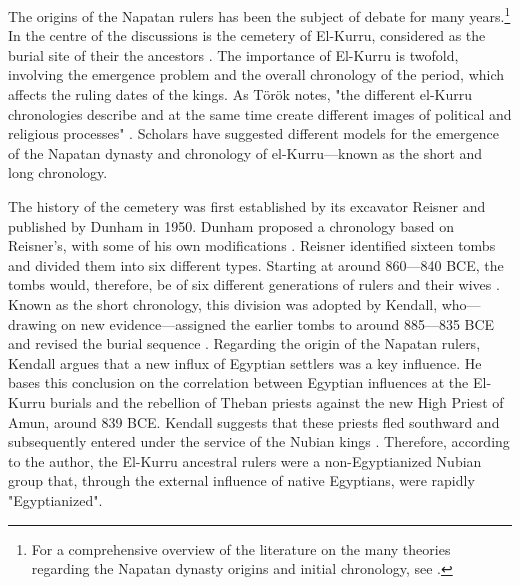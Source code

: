 The origins of the Napatan rulers has been the subject of debate for many years.\footnote{For a comprehensive overview of the literature on the many theories regarding the Napatan dynasty origins and initial chronology, see \cite{morkotPriestlyOriginNapatan2003}.} In the centre of the discussions is the cemetery of El-Kurru, considered as the burial site of their the ancestors \parencite{törökKingdomKushHandbook1997, törökTwoWorldsFrontier2009, morkotKingshipKinshipEmpire1999}. The importance of El-Kurru is twofold, involving the emergence problem and the overall chronology of the period, which affects the ruling dates of the kings. As Török notes, "the different el-Kurru chronologies describe and at the same time create different images of political and religious processes" \parencite[p.~304]{törökTwoWorldsFrontier2009}. Scholars have suggested different models for the emergence of the Napatan dynasty and chronology of el-Kurru---known as the short and long chronology.


The history of the cemetery was first established by its excavator Reisner and published by Dunham in 1950. Dunham proposed a chronology based on Reisner's, with some of his own modifications \parencite[p.~2]{dunhamElKurru1950}. Reisner identified sixteen tombs and divided them into six different types. Starting at around 860---840 BCE, the tombs would, therefore, be of six different generations of rulers and their wives \parencite{reisnerDiscoveryTombsEgyptian1919, reisnerNoteHarvardBostonExcavations1920}. Known as the short chronology, this division was adopted by Kendall, who---drawing on new evidence---assigned the earlier tombs to around 885---835 BCE and revised the burial sequence \parencite[p.~4]{kendallOriginNapatanState1999}. Regarding the origin of the Napatan rulers, Kendall argues that a new influx of Egyptian settlers was a key influence. He bases this conclusion on the correlation between Egyptian influences at the El-Kurru burials and the rebellion of Theban priests against the new High Priest of Amun, around 839 BCE. Kendall suggests that these priests fled southward and subsequently entered under the service of the Nubian kings \parencite[p.~5,57]{kendallOriginNapatanState1999}.  Therefore, according to the author, the El-Kurru ancestral rulers were a non-Egyptianized Nubian group that, through the external influence of native Egyptians, were rapidly "Egyptianized".


